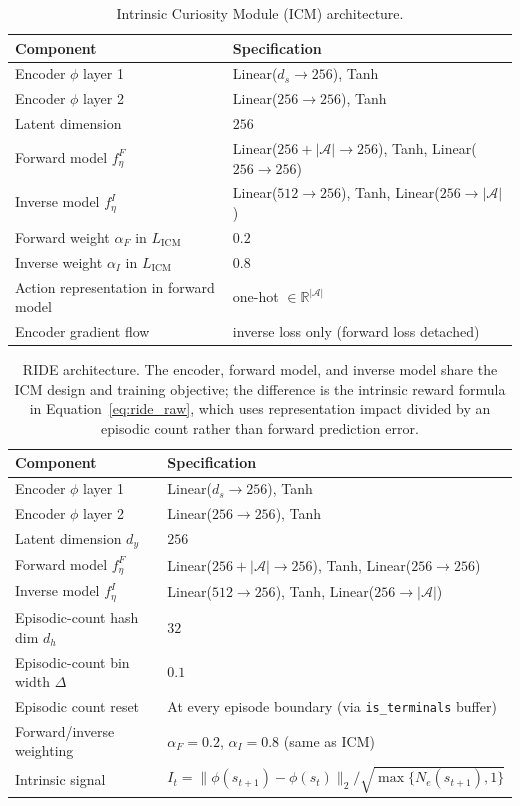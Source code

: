 \begin{table}[H]
\centering
\caption{Intrinsic Curiosity Module (ICM) architecture.}
\label{tab:icm_arch}
\begin{tabular}{|p{4cm}|p{10cm}|}
\hline
\textbf{Component} & \textbf{Specification} \\
\hline
Encoder $\phi$ layer 1 & Linear($d_s \to 256$), Tanh \\
\hline
Encoder $\phi$ layer 2 & Linear($256 \to 256$), Tanh \\
\hline
Latent dimension & $256$ \\
\hline
Forward model $f^F_\eta$ & Linear($256 + |\mathcal{A}| \to 256$), Tanh, Linear($256 \to 256$) \\
\hline
Inverse model $f^I_\eta$ & Linear($512 \to 256$), Tanh, Linear($256 \to |\mathcal{A}|$) \\
\hline
Forward weight $\alpha_F$ in $L_\text{ICM}$ & $0.2$ \\
\hline
Inverse weight $\alpha_I$ in $L_\text{ICM}$ & $0.8$ \\
\hline
Action representation in forward model & one-hot $\in \mathbb{R}^{|\mathcal{A}|}$ \\
\hline
Encoder gradient flow & inverse loss only (forward loss detached) \\
\hline
\end{tabular}
\end{table}

\begin{table}[H]
\centering
\caption[RIDE architecture.]{RIDE architecture. The encoder, forward model, and inverse model share the ICM design and training objective; the difference is the intrinsic reward formula in Equation~\eqref{eq:ride_raw}, which uses representation impact divided by an episodic count rather than forward prediction error.}
\label{tab:ride_arch}
\begin{tabular}{|l|l|}
\hline
\textbf{Component} & \textbf{Specification} \\
\hline
Encoder $\phi$ layer 1 & Linear($d_s \to 256$), Tanh \\
\hline
Encoder $\phi$ layer 2 & Linear($256 \to 256$), Tanh \\
\hline
Latent dimension $d_y$ & $256$ \\
\hline
Forward model $f^F_\eta$ & Linear($256 + |\mathcal{A}| \to 256$), Tanh, Linear($256 \to 256$) \\
\hline
Inverse model $f^I_\eta$ & Linear($512 \to 256$), Tanh, Linear($256 \to |\mathcal{A}|$) \\
\hline
Episodic-count hash dim $d_h$ & $32$ \\
\hline
Episodic-count bin width $\Delta$ & $0.1$ \\
\hline
Episodic count reset & At every episode boundary (via \texttt{is\_terminals} buffer) \\
\hline
Forward/inverse weighting & $\alpha_F = 0.2$, $\alpha_I = 0.8$ (same as ICM) \\
\hline
Intrinsic signal & $I_t = \| \phi(s_{t+1}) - \phi(s_t) \|_2 / \sqrt{\max\{N_e(s_{t+1}), 1\}}$ \\
\hline
\end{tabular}
\end{table}

